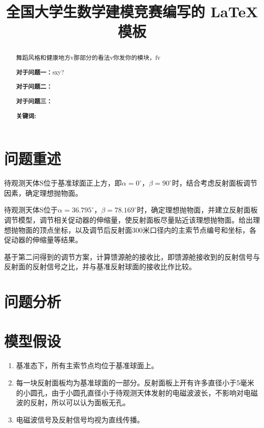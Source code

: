 \documentclass[withoutpreface,bwprint]{cumcmthesis} %
\title{全国大学生数学建模竞赛编写的 \LaTeX{} 模板}
\begin{document}
\maketitle
\begin{abstract}



舞蹈风格和健康地方v那部分的看法v你发你的模块，fv


\textbf{对于问题一：}sxy?

\textbf{对于问题二：}

\textbf{对于问题三：}

\textbf{关键词:}
\end{abstract}



\section{问题重述}

 \begin{problem}
待观测天体S位于基准球面正上方，即$\alpha=0^{\circ}$，$\beta=90^{\circ}$时，结合考虑反射面板调节因素，确定理想抛物面。
 \end{problem}
 \begin{problem}
待观测天体S位于$\alpha=36.795^{\circ}$，$\beta=78.169^{\circ}$时，确定理想抛物面，并建立反射面板调节模型，调节相关促动器的伸缩量，使反射面板尽量贴近该理想抛物面。给出理想抛物面的顶点坐标，以及调节后反射面300米口径内的主索节点编号和坐标，各促动器的伸缩量等结果。
 \end{problem}
 \begin{problem}
基于第二问得到的调节方案，计算馈源舱的接收比，即馈源舱接收到的反射信号与反射面的反射信号之比，并与基准反射球面的接收比作比较。
\end{problem}

\section{问题分析}

\section{模型假设}
\begin{enumerate}
    \item 基准态下，所有主索节点均位于基准球面上。
    \item 每一块反射面板均为基准球面的一部分。反射面板上开有许多直径小于5毫米的小圆孔，由于小圆孔直径小于待观测天体发射的电磁波波长，不影响对电磁波的反射，所以可以认为面板无孔。
    \item 电磁波信号及反射信号均视为直线传播。
\end{enumerate}
\end{document}
